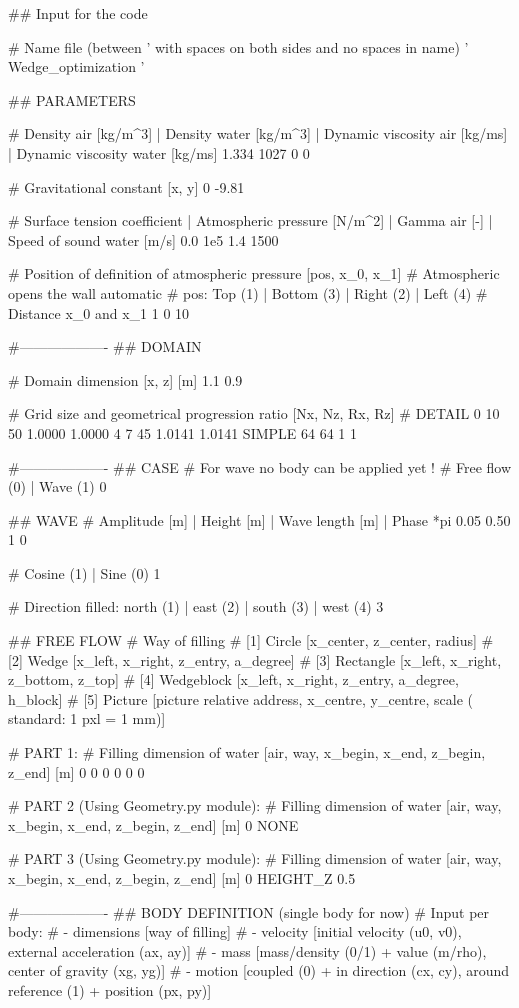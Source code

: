 ## Input for the code

# Name file (between ' with spaces on both sides and no spaces in name)
' Wedge_optimization '

## PARAMETERS

# Density air [kg/m^3] | Density water [kg/m^3] | Dynamic viscosity air [kg/ms] | Dynamic viscosity water [kg/ms]
1.334 1027 0 0

# Gravitational constant [x, y]
0 -9.81

# Surface tension coefficient | Atmospheric pressure [N/m^2] | Gamma air [-]	| Speed of sound water [m/s]
0.0 	1e5 	1.4		1500

# Position of definition of atmospheric pressure [pos, x_0, x_1]
# Atmospheric opens the wall automatic
# pos: Top (1)	| Bottom (3)	| Right (2)		| Left (4)
# Distance x_0 and x_1
1 0 10

#-------------------
## DOMAIN

# Domain dimension [x, z] [m]
1.1 0.9

# Grid size and geometrical progression ratio [Nx, Nz, Rx, Rz]
# DETAIL 0 10 50 1.0000 1.0000 4 7 45 1.0141 1.0141
SIMPLE 64 64 1 1


#-------------------
## CASE
# For wave no body can be applied yet !
# Free flow (0)	| Wave (1)
0

## WAVE
# Amplitude [m] | Height [m]	| Wave length [m]	| Phase *pi
0.05 	0.50		1		0

# Cosine (1)	| Sine (0)
1

# Direction filled: north (1)	| east (2)	|	south (3)	| west (4)
3

## FREE FLOW
# Way of filling
# [1] Circle        [x_center, z_center, radius]
# [2] Wedge         [x_left, x_right, z_entry, a_degree]
# [3] Rectangle     [x_left, x_right, z_bottom, z_top]
# [4] Wedgeblock    [x_left, x_right, z_entry, a_degree, h_block]
# [5] Picture		[picture relative address, x_centre, y_centre, scale ( standard: 1 pxl = 1 mm)]

# PART 1:
# Filling dimension of water [air, way, x_begin, x_end, z_begin, z_end] [m]
0 0 0 0 0 0

# PART 2 (Using Geometry.py module):
# Filling dimension of water [air, way, x_begin, x_end, z_begin, z_end] [m]
0 NONE

# PART 3 (Using Geometry.py module):
# Filling dimension of water [air, way, x_begin, x_end, z_begin, z_end] [m]
0 HEIGHT_Z 0.5

#-------------------
## BODY DEFINITION (single body for now)
# Input per body:
# - dimensions      [way of filling]
# - velocity        [initial velocity (u0, v0), external acceleration (ax, ay)]
# - mass            [mass/density (0/1) + value (m/rho), center of gravity (xg, yg)]
# - motion          [coupled (0) + in direction (cx, cy), around reference (1) + position (px, py)]

